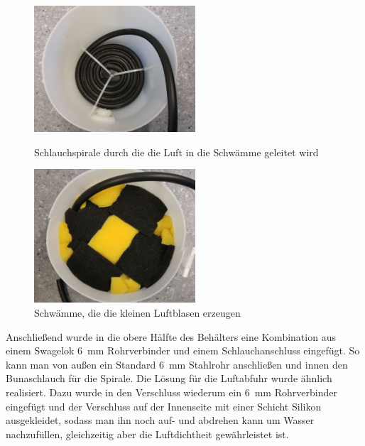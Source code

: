 \begin{figure}[h]
	\begin{minipage}[hbt]{6cm}
		\centering
		\includegraphics[width=6cm]{Luftbefeuchter_Spirale.jpg}
		\caption{Schlauchspirale durch die die Luft in die Schwämme geleitet wird}
	\end{minipage}
	\hfill
	\begin{minipage}[hbt]{6cm}
		\centering
		\includegraphics[width=6cm]{Luftbefeuchter_Schwaemme.jpg}
		\caption{Schwämme, die die kleinen Luftblasen erzeugen}
	\end{minipage}
\end{figure}

Anschließend wurde in die obere Hälfte des Behälters eine Kombination aus einem Swagelok \SI{6}{mm} Rohrverbinder und einem Schlauchanschluss eingefügt. So kann man von außen ein Standard \SI{6}{mm} Stahlrohr anschließen und innen den Bunaschlauch für die Spirale. Die Lösung für die Luftabfuhr wurde ähnlich realisiert. Dazu wurde in den Verschluss wiederum ein \SI{6}{mm} Rohrverbinder eingefügt und der Verschluss auf der Innenseite mit einer Schicht Silikon ausgekleidet, sodass man ihn noch auf- und abdrehen kann um Wasser nachzufüllen, gleichzeitig aber die Luftdichtheit gewährleistet ist.

